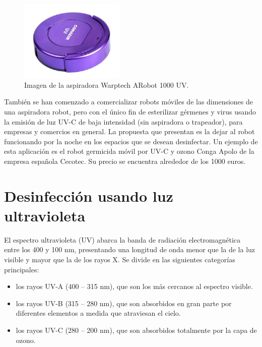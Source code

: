 \begin{figure}[h]
	\centering
	\includegraphics[width=5cm]{./Figures/coradiruv.jpg}
	\caption{Imagen de la aspiradora Warptech ARobot 1000 UV\protect\footnotemark.}
	\label{fig:coradiruv}
\end{figure}


También se han comenzado a comercializar  robots móviles de las dimensiones de una aspiradora robot, pero con el único fin de esterilizar gérmenes y virus usando la emisión de luz UV-C de baja intensidad (sin aspiradora o trapeador), para empresas y comercios en general. La propuesta que presentan es la dejar al robot funcionando por la noche en los espacios que se desean desinfectar. Un ejemplo de esta aplicación es el robot germicida móvil por UV-C y ozono  Conga Apolo \citep{conga} de la empresa española Cecotec. Su precio se encuentra alrededor de los 1000 euros.


\section{Desinfección usando luz ultravioleta}

El espectro ultravioleta (UV) abarca la banda de radiación electromagnética entre los 400 y 100 nm, presentando una longitud de onda menor que la de la luz visible y mayor que la de los rayos X.  Se divide en las siguientes categorías principales:

\begin{itemize}
	\item los rayos UV-A (400 – 315 nm), que son los más cercanos al espectro visible.
	\item los rayos UV-B (315 – 280 nm), que son absorbidos en gran parte por diferentes elementos a medida que atraviesan el cielo.
	\item los rayos UV-C (280 – 200 nm), que son absorbidos totalmente por la capa de ozono.
\end{itemize}

